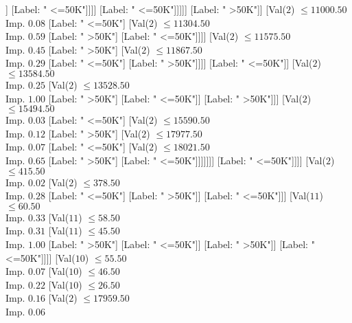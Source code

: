 \documentclass[margin=10pt]{standalone}
\begin{document}
\begin{forest}
																								[Label: " <=50K"]
																								[Label: " >50K"]]
																							[Label: " <=50K"]]]]
																				[Label: " <=50K"]]]]]
																[Label: " >50K"]]
															[Val($2$) $ \leq 11000.50$ \\ Imp. $0.08$
																[Label: " <=50K"]
																[Val($2$) $ \leq 11304.50$ \\ Imp. $0.59$
																	[Label: " >50K"]
																	[Label: " <=50K"]]]]
														[Val($2$) $ \leq 11575.50$ \\ Imp. $0.45$
															[Label: " >50K"]
															[Val($2$) $ \leq 11867.50$ \\ Imp. $0.29$
																[Label: " <=50K"]
																[Label: " >50K"]]]]
													[Label: " <=50K"]]
												[Val($2$) $ \leq 13584.50$ \\ Imp. $0.25$
													[Val($2$) $ \leq 13528.50$ \\ Imp. $1.00$
														[Label: " >50K"]
														[Label: " <=50K"]]
													[Label: " >50K"]]]
											[Val($2$) $ \leq 15494.50$ \\ Imp. $0.03$
												[Label: " <=50K"]
												[Val($2$) $ \leq 15590.50$ \\ Imp. $0.12$
													[Label: " >50K"]
													[Val($2$) $ \leq 17977.50$ \\ Imp. $0.07$
														[Label: " <=50K"]
														[Val($2$) $ \leq 18021.50$ \\ Imp. $0.65$
															[Label: " >50K"]
															[Label: " <=50K"]]]]]]]
									[Label: " <=50K"]]]]
						[Val($2$) $ \leq 415.50$ \\ Imp. $0.02$
							[Val($2$) $ \leq 378.50$ \\ Imp. $0.28$
								[Label: " <=50K"]
								[Label: " >50K"]]
							[Label: " <=50K"]]]
					[Val($11$) $ \leq 60.50$ \\ Imp. $0.33$
						[Val($11$) $ \leq 58.50$ \\ Imp. $0.31$
							[Val($11$) $ \leq 45.50$ \\ Imp. $1.00$
								[Label: " >50K"]
								[Label: " <=50K"]]
							[Label: " >50K"]]
						[Label: " <=50K"]]]]
			[Val($10$) $ \leq 55.50$ \\ Imp. $0.07$
				[Val($10$) $ \leq 46.50$ \\ Imp. $0.22$
					[Val($10$) $ \leq 26.50$ \\ Imp. $0.16$
						[Val($2$) $ \leq 17959.50$ \\ Imp. $0.06$

\end{forest}
\end{document}
